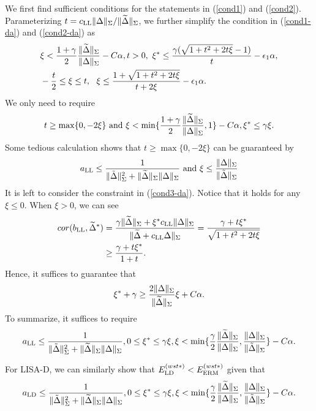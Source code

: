We first find sufficient conditions for the statements in (\ref{cond1}) and (\ref{cond2}).
Parameterizing $t=c_{\textup{LL}}\|\Delta\|_{\Sigma}/\|\widetilde{\Delta}\|_{\Sigma}$, we further simplify the condition in (\ref{cond1-da}) and (\ref{cond2-da}) as
\begin{align*}
   & \xi < \frac{1+\gamma}{2}\frac{\|\widetilde{\Delta}\|_{\Sigma}}{\|\Delta\|_{\Sigma}}-C\alpha,t>0,~\xi^*\leq \frac{\gamma(\sqrt{1+t^2+2t\xi}-1)}{t}-\epsilon_1\alpha,\\
   &-\frac{t}{2}\leq \xi\leq t,~~\xi\leq \frac{1+\sqrt{1+t^2+2t\xi}}{t+2\xi}-\epsilon_1\alpha.
\end{align*}
We only need to require
\[
  t\geq \max\{0,-2\xi\}~\text{and}~\xi < \min\{\frac{1+\gamma}{2}\frac{\|\widetilde{\Delta}\|_{\Sigma}}{\|\Delta\|_{\Sigma}},1\}-C\alpha, \xi^*\leq \gamma\xi.
\]
Some tedious calculation shows that $t\geq\max\{0,-2\xi\}$ can be guaranteed by
\[
 a_{\textup{LL}}\leq \frac{1}{\|\tilde{\Delta}\|_{\Sigma}^2+\|\widetilde{\Delta}\|_{\Sigma}\|\Delta\|_{\Sigma}}~\text{and}~\xi\leq \frac{\|\Delta\|_{\Sigma}}{\|\tilde{\Delta}\|_{\Sigma}}
\]
It is left to consider the constraint in (\ref{cond3-da}).
Notice that it holds for any $\xi\leq 0$. When $\xi>0$, we can see
\begin{align*}
cor(b_{\textup{LL}},\widetilde{\Delta}^*)&=\frac{\gamma\|\widetilde{\Delta}\|_{\Sigma}+\xi^* c_{\textup{LL}}\|\Delta\|_{\Sigma}}{\|\widetilde{\Delta}+c_{\textup{LL}}\Delta\|_{\Sigma}}=\frac{\gamma+t\xi^*}{\sqrt{1+t^2+2t\xi}}\\
&\geq \frac{\gamma+t\xi^*}{1+t}.
\end{align*}
Hence, it suffices to guarantee that 
\[
  \xi^*+\gamma\geq \frac{2\|\Delta\|_{\Sigma}}{\|\widetilde{\Delta}\|_{\Sigma}}\xi+C\alpha.
\]
To summarize, it suffices to require
\[
  a_{\textup{LL}}\leq \frac{1}{\|\tilde{\Delta}\|_{\Sigma}^2+\|\widetilde{\Delta}\|_{\Sigma}\|\Delta\|_{\Sigma}},0\leq \xi^*\leq \gamma\xi,\xi < \min\{\frac{\gamma}{2}\frac{\|\widetilde{\Delta}\|_{\Sigma}}{\|\Delta\|_{\Sigma}},\frac{\|\Delta\|_{\Sigma}}{\|\tilde{\Delta}\|_{\Sigma}}\}-C\alpha. 
\]

For LISA-D, we can similarly show that $E^{(wst*)}_{\textup{LD}}< E^{(wst*)}_{\textup{ERM}}$ given that
\[
 a_{\textup{LD}}\leq \frac{1}{\|\tilde{\Delta}\|_{\Sigma}^2+\|\widetilde{\Delta}\|_{\Sigma}\|\Delta\|_{\Sigma}},0\leq \xi^*\leq \gamma\xi,\xi < \min\{\frac{\gamma}{2}\frac{\|\widetilde{\Delta}\|_{\Sigma}}{\|\Delta\|_{\Sigma}},\frac{\|\Delta\|_{\Sigma}}{\|\tilde{\Delta}\|_{\Sigma}}\}-C\alpha. 
\]
